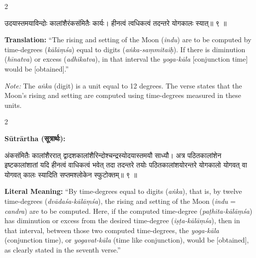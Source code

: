 \documentclass[11pt,a4paper]{article}
\newcommand{\dev}[1]{{\devanagarifont #1}}
\newenvironment{sanskritverse}{%
  \begin{center}\begin{minipage}{0.95\textwidth}
  \setlength{\leftskip}{1em}
  \setlength{\rightskip}{1em}
  \dev
}{\end{minipage}\end{center}}
\begin{document}
\begin{paracol}{2}

\begin{sanskritverse}
उदयास्तमयाविन्दोः कालांशैरंकसंमितैः कार्यः।
हीनत्वं त्वधिकत्वं तदन्तरे योगकालः स्यात्॥ ९ ॥
\end{sanskritverse}

\switchcolumn

\textbf{Translation:} ``The rising and setting of the Moon (\textit{indu}) are to be computed by time-degrees (\textit{kālāṃśa}) equal to digits (\textit{aṅka-saṃmitaiḥ}). If there is diminution (\textit{hīnatva}) or excess (\textit{adhikatva}), in that interval the \textit{yoga-kāla} [conjunction time] would be [obtained].''

\textit{Note:} The \textit{aṅka} (digit) is a unit equal to 12 degrees. The verse states that the Moon's rising and setting are computed using time-degrees measured in these units.

\end{paracol}

\vspace{0.5em}

\begin{paracol}{2}

\noindent\textbf{Sūtrārtha (\dev{सूत्रार्थः}):}
\begin{sanskritverse}
अंकसंमितैः कालांशैररात् द्वादशकालांशैरिन्दोश्चन्द्रस्योदयास्तमयौ साध्यौ।
अत्र पठितकालांशेन इष्टकालांशातां यदि हीनत्वं वाधिकत्वं भवेत् तदा तदन्तरे तयोः
पठितकालांशयोरन्तरे योगकालो योगवत्‌ वा योगवत्‌ कालः स्यादिति सप्तमश्लोकेन
स्फुटोक्तम्॥ ९ ॥
\end{sanskritverse}

\switchcolumn

\textbf{Literal Meaning:} ``By time-degrees equal to digits (\textit{aṅka}), that is, by twelve time-degrees (\textit{dvādaśa-kālāṃśa}), the rising and setting of the Moon (\textit{indu} = \textit{candra}) are to be computed. Here, if the computed time-degree (\textit{paṭhita-kālāṃśa}) has diminution or excess from the desired time-degree (\textit{iṣṭa-kālāṃśa}), then in that interval, between those two computed time-degrees, the \textit{yoga-kāla} (conjunction time), or \textit{yogavat-kāla} (time like conjunction), would be [obtained], as clearly stated in the seventh verse.''

\end{paracol}
\end{document}
